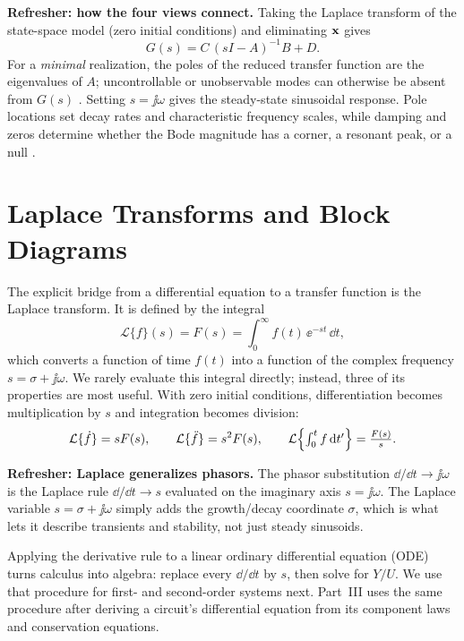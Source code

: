 \begin{controlsbox}
\textbf{Refresher: how the four views connect.} Taking the Laplace transform of
the state-space model (zero initial conditions) and eliminating \(\mathbf{x}\) gives
\[
G(s)=C\,(sI-A)^{-1}B+D .
\]
For a \emph{minimal} realization, the poles of the reduced transfer function are
the eigenvalues of \(A\); uncontrollable or unobservable modes can otherwise be
absent from \(G(s)\) \cite[pp.~264--266]{leigh2012control}. Setting
\(s=\jj\omega\) gives the steady-state sinusoidal response. Pole locations set
decay rates and characteristic frequency scales, while damping and zeros determine
whether the Bode magnitude has a corner, a resonant peak, or a null
\cite[pp.~42--44, 55--58]{leigh2012control}.
\end{controlsbox}

\section{Laplace Transforms and Block Diagrams}
The explicit bridge from a differential equation to a transfer function is the
Laplace transform. It is defined by the integral
\[
\mathcal{L}\{f\}(s)=F(s)=\int_0^\infty f(t)\,\ee^{-st}\,\dd t,
\]
which converts a function of time \(f(t)\) into a function of the complex
frequency \(s=\sigma+\jj\omega\). We rarely evaluate this integral directly;
instead, three of its properties are most useful. With zero initial
conditions, differentiation becomes multiplication by \(s\) and integration
becomes division:
\[
\mathcal{L}\{\dot f\}=sF(s),\qquad
\mathcal{L}\{\ddot f\}=s^2F(s),\qquad
\mathcal{L}\Bigl\{\textstyle\int_0^t f\,\mathrm{d} t'\Bigr\}=\frac{F(s)}{s}.
\]
\cite[pp.~29--35]{leigh2012control}

\begin{controlsbox}
\textbf{Refresher: Laplace generalizes phasors.} The phasor substitution
\(\dd/\dd t\to\jj\omega\) is the Laplace rule \(\dd/\dd t\to s\) evaluated on the
imaginary axis \(s=\jj\omega\). The Laplace variable \(s=\sigma+\jj\omega\) simply
adds the growth/decay coordinate \(\sigma\), which is what lets it describe
transients and stability, not just steady sinusoids.
\end{controlsbox}

Applying the derivative rule to a linear ordinary differential equation (ODE)
turns calculus into algebra: replace every \(\dd/\dd t\) by \(s\), then solve for
\(Y/U\). We use that procedure for first- and second-order systems next. Part~III
uses the same procedure after deriving a circuit's differential equation from its
component laws and conservation equations.

